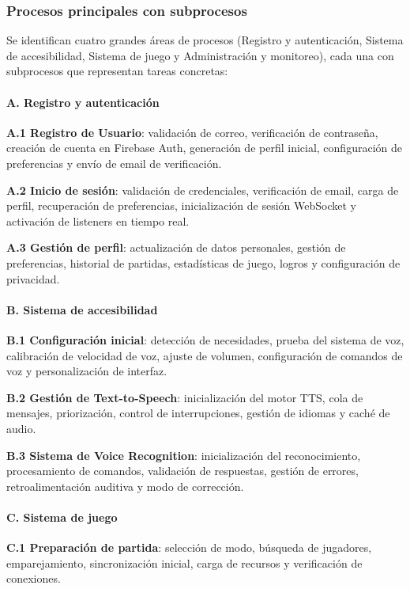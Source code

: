 \documentclass[12pt]{article}
\begin{document}
\subsubsection*{Procesos principales con subprocesos}
Se identifican cuatro grandes áreas de procesos (Registro y autenticación, Sistema de accesibilidad, Sistema de juego y Administración y monitoreo), cada una con subprocesos que representan tareas concretas:
\paragraph{A. Registro y autenticación}
  \textbf{A.1 Registro de Usuario}: validación de correo, verificación de contraseña, creación de cuenta en Firebase Auth, generación de perfil inicial, configuración de preferencias y envío de email de verificación.

  \textbf{A.2 Inicio de sesión}: validación de credenciales, verificación de email, carga de perfil, recuperación de preferencias, inicialización de sesión WebSocket y activación de listeners en tiempo real.

  \textbf{A.3 Gestión de perfil}: actualización de datos personales, gestión de preferencias, historial de partidas, estadísticas de juego, logros y configuración de privacidad.

\paragraph{B. Sistema de accesibilidad}
  \textbf{B.1 Configuración inicial}: detección de necesidades, prueba del sistema de voz, calibración de velocidad de voz, ajuste de volumen, configuración de comandos de voz y personalización de interfaz.

  \textbf{B.2 Gestión de Text-to-Speech}: inicialización del motor TTS, cola de mensajes, priorización, control de interrupciones, gestión de idiomas y caché de audio.

  \textbf{B.3 Sistema de Voice Recognition}: inicialización del reconocimiento, procesamiento de comandos, validación de respuestas, gestión de errores, retroalimentación auditiva y modo de corrección.

\paragraph{C. Sistema de juego}
  \textbf{C.1 Preparación de partida}: selección de modo, búsqueda de jugadores, emparejamiento, sincronización inicial, carga de recursos y verificación de conexiones.
\end{document}
